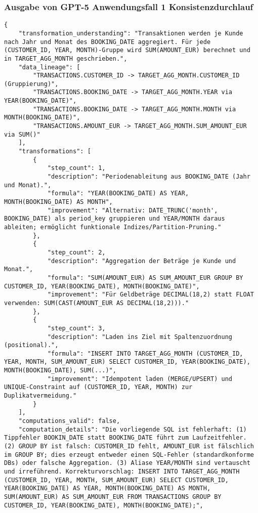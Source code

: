 \subsubsection{Ausgabe von GPT-5 Anwendungsfall 1 Konsistenzdurchlauf}\label{anhang:subsubsec:gpt_case1_prompt2}
\begin{lstlisting}[caption={Ausgabe: GPT-5 Anwendungsfall 1 Konsistenzdurchlauf},label={gpt_case1_prompt2}]
{
    "transformation_understanding": "Transaktionen werden je Kunde nach Jahr und Monat des BOOKING_DATE aggregiert. Für jede (CUSTOMER_ID, YEAR, MONTH)-Gruppe wird SUM(AMOUNT_EUR) berechnet und in TARGET_AGG_MONTH geschrieben.",
    "data_lineage": [
        "TRANSACTIONS.CUSTOMER_ID -> TARGET_AGG_MONTH.CUSTOMER_ID (Gruppierung)",
        "TRANSACTIONS.BOOKING_DATE -> TARGET_AGG_MONTH.YEAR via YEAR(BOOKING_DATE)",
        "TRANSACTIONS.BOOKING_DATE -> TARGET_AGG_MONTH.MONTH via MONTH(BOOKING_DATE)",
        "TRANSACTIONS.AMOUNT_EUR -> TARGET_AGG_MONTH.SUM_AMOUNT_EUR via SUM()"
    ],
    "transformations": [
        {
            "step_count": 1,
            "description": "Periodenableitung aus BOOKING_DATE (Jahr und Monat).",
            "formula": "YEAR(BOOKING_DATE) AS YEAR, MONTH(BOOKING_DATE) AS MONTH",
            "improvement": "Alternativ: DATE_TRUNC('month', BOOKING_DATE) als period_key gruppieren und YEAR/MONTH daraus ableiten; ermöglicht funktionale Indizes/Partition-Pruning."
        },
        {
            "step_count": 2,
            "description": "Aggregation der Beträge je Kunde und Monat.",
            "formula": "SUM(AMOUNT_EUR) AS SUM_AMOUNT_EUR GROUP BY CUSTOMER_ID, YEAR(BOOKING_DATE), MONTH(BOOKING_DATE)",
            "improvement": "Für Geldbeträge DECIMAL(18,2) statt FLOAT verwenden: SUM(CAST(AMOUNT_EUR AS DECIMAL(18,2)))."
        },
        {
            "step_count": 3,
            "description": "Laden ins Ziel mit Spaltenzuordnung (positional).",
            "formula": "INSERT INTO TARGET_AGG_MONTH (CUSTOMER_ID, YEAR, MONTH, SUM_AMOUNT_EUR) SELECT CUSTOMER_ID, YEAR(BOOKING_DATE), MONTH(BOOKING_DATE), SUM(...)",
            "improvement": "Idempotent laden (MERGE/UPSERT) und UNIQUE-Constraint auf (CUSTOMER_ID, YEAR, MONTH) zur Duplikatvermeidung."
        }
    ],
    "computations_valid": false,
    "computation_details": "Die vorliegende SQL ist fehlerhaft: (1) Tippfehler BOOKIN_DATE statt BOOKING_DATE führt zum Laufzeitfehler. (2) GROUP BY ist falsch: CUSTOMER_ID fehlt, AMOUNT_EUR ist fälschlich im GROUP BY; dies erzeugt entweder einen SQL-Fehler (standardkonforme DBs) oder falsche Aggregation. (3) Aliase YEAR/MONTH sind vertauscht und irreführend. Korrekturvorschlag: INSERT INTO TARGET_AGG_MONTH (CUSTOMER_ID, YEAR, MONTH, SUM_AMOUNT_EUR) SELECT CUSTOMER_ID, YEAR(BOOKING_DATE) AS YEAR, MONTH(BOOKING_DATE) AS MONTH, SUM(AMOUNT_EUR) AS SUM_AMOUNT_EUR FROM TRANSACTIONS GROUP BY CUSTOMER_ID, YEAR(BOOKING_DATE), MONTH(BOOKING_DATE);",

\end{lstlisting}
